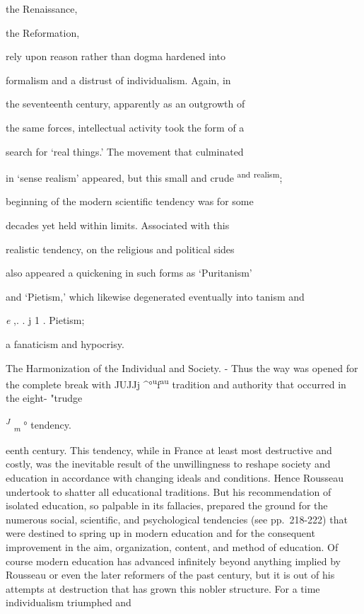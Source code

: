 \documentclass[
]{book}
\begin{document}
the Renaissance,

the Reformation,

rely upon reason rather than dogma hardened into

formalism and a distrust of individualism. Again, in

the seventeenth century, apparently as an outgrowth of

the same forces, intellectual activity took the form of a

search for `real things.' The movement that culminated

in `sense realism' appeared, but this small and crude \textsuperscript{and} \textsuperscript{realism};

beginning of the modern scientific tendency was for some

decades yet held within limits. Associated with this

realistic tendency, on the religious and political sides

also appeared a quickening in such forms as `Puritanism'

and `Pietism,' which likewise degenerated eventually into tanism and

\emph{e} ,. . j 1 . Pietism;

a fanaticism and hypocrisy.

The Harmonization of the Individual and Society. - Thus the way was opened for the complete break with JUJJj \^{}°\textsuperscript{u}\textbar\textbar f\textsuperscript{au} tradition and authority that occurred in the eight- "trudge

\emph{\textsuperscript{J} \textsubscript{m}} ° tendency.

eenth century. This tendency, while in France at least most destructive and costly, was the inevitable result of the unwillingness to reshape society and education in accordance with changing ideals and conditions. Hence Rousseau undertook to shatter all educational traditions. But his recommendation of isolated education, so palpable in its fallacies, prepared the ground for the numerous social, scientific, and psychological tendencies (see pp.~218-222) that were destined to spring up in modern education and for the consequent improvement in the aim, organization, content, and method of education. Of course modern education has advanced infinitely beyond anything implied by Rousseau or even the later reformers of the past century, but it is out of his attempts at destruction that has grown this nobler structure. For a time individualism triumphed and
\end{document}
